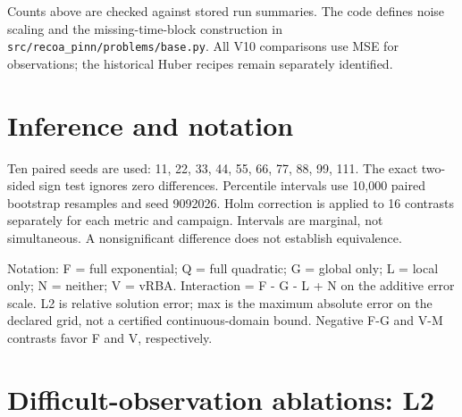 \documentclass[
  11pt,
]{article}
\begin{document}
Counts above are checked against stored run summaries. The code defines
noise scaling and the missing-time-block construction in
\texttt{src/recoa\_pinn/problems/base.py}. All V10 comparisons use MSE
for observations; the historical Huber recipes remain separately
identified.

\hypertarget{inference-and-notation}{%
\section{Inference and notation}\label{inference-and-notation}}

Ten paired seeds are used: 11, 22, 33, 44, 55, 66, 77, 88, 99, 111. The
exact two-sided sign test ignores zero differences. Percentile intervals
use 10,000 paired bootstrap resamples and seed 9092026. Holm correction
is applied to 16 contrasts separately for each metric and campaign.
Intervals are marginal, not simultaneous. A nonsignificant difference
does not establish equivalence.

Notation: F = full exponential; Q = full quadratic; G = global only; L =
local only; N = neither; V = vRBA. Interaction = F - G - L + N on the
additive error scale. L2 is relative solution error; max is the maximum
absolute error on the declared grid, not a certified continuous-domain
bound. Negative F-G and V-M contrasts favor F and V, respectively.

\newpage

\hypertarget{difficult-observation-ablations-l2}{%
\section{Difficult-observation ablations:
L2}\label{difficult-observation-ablations-l2}}

\begingroup\small
\end{document}
